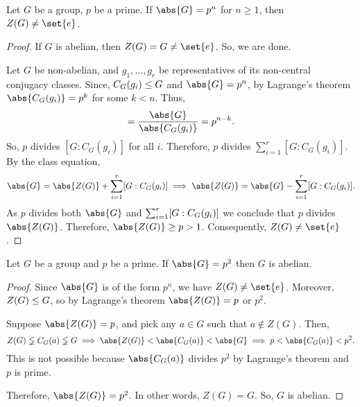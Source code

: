 \documentclass[11pt]{penrose}
\begin{document}
\begin{nthm}
    Let $G$ be a group, $p$ be a prime. If $\abs{G} = p^{n}$ for $n \geq 1$, then $Z(G) \neq \set{e}$.
\end{nthm}
\begin{proof}
    If $G$ is abelian, then $Z(G) = G \neq \set{e}$. So, we are done.

    Let $G$ be non-abelian, and $g_{1}, \dots, g_{r}$ be representatives of its non-central conjugacy classes. Since, $C_{G}(g_{i}) \mathrel{\leq} G$ and $\abs{G} = p^{n}$, by Lagrange's theorem $\abs{C_{G}(g_{i})} = p^{k}$ for some $k < n$. Thus,
    \begin{equation*}
        [G : C_{G}(g_{i})] = \frac{\abs{G}}{\abs{C_{G}(g_{i})}} = p^{n-k}.
    \end{equation*}
    So, $p$ divides $[G : C_{G}(g_{i})]$ for all $i$. Therefore, $p$ divides $\sum_{i=1}^{r} [G : C_{G}(g_{i})]$. By the class equation,
    \begin{equation*}
        \abs{G} = \abs{Z(G)} + \sum_{i=1}^{r} \comm{G : C_{G}(g_{i})}
        \implies
        \abs{Z(G)} = \abs{G} - \sum_{i=1}^{r} \comm{G : C_{G}(g_{i})}.
    \end{equation*}
    As $p$ divides both $\abs{G}$ and $\sum_{i=1}^{r} \lbrack G : C_{G}(g_{i})\rbrack$ we conclude that $p$ divides $\abs{Z(G)}$. Therefore, $\abs{Z(G)} \geq p > 1$. Consequently, $Z(G) \neq \set{e}$.
\end{proof}

\begin{ncor}
    Let $G$ be a group and $p$ be a prime. If $\abs{G} = p^{2}$ then $G$ is abelian.
\end{ncor}
\begin{proof}
    Since $\abs{G}$ is of the form $p^{n}$, we have $Z(G) \neq \set{e}$. Moreover, $Z(G) \mathrel{\leq} G$, so by Lagrange's theorem $\abs{Z(G)} = p$ or $p^{2}$.

    Suppose $\abs{Z(G)} = p$, and pick any $a \in G$ such that $a \notin Z(G)$. Then,
    \begin{equation*}
        Z(G) \lneqq C_{G}(a) \lneqq G
        \implies
        \abs{Z(G)} < \abs{C_{G}(a)} < \abs{G}
        \implies
        p < \abs{C_{G}(a)} < p^{2}.
    \end{equation*}
    This is not possible because $\abs{C_{G}(a)}$ divides $p^{2}$ by Lagrange's theorem and $p$ is prime.

    Therefore, $\abs{Z(G)} = p^{2}$. In other words, $Z(G) = G$. So, $G$ is abelian.
\end{proof}
\end{document}
